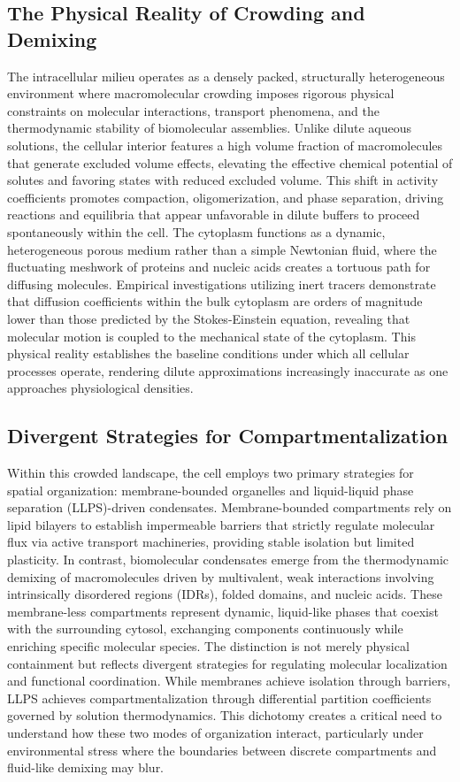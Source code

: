 \documentclass[conference]{IEEEtran}
\begin{document}
\subsection{The Physical Reality of Crowding and Demixing}
The intracellular milieu operates as a densely packed, structurally heterogeneous environment where macromolecular crowding imposes rigorous physical constraints on molecular interactions, transport phenomena, and the thermodynamic stability of biomolecular assemblies. Unlike dilute aqueous solutions, the cellular interior features a high volume fraction of macromolecules that generate excluded volume effects, elevating the effective chemical potential of solutes and favoring states with reduced excluded volume. This shift in activity coefficients promotes compaction, oligomerization, and phase separation, driving reactions and equilibria that appear unfavorable in dilute buffers to proceed spontaneously within the cell. The cytoplasm functions as a dynamic, heterogeneous porous medium rather than a simple Newtonian fluid, where the fluctuating meshwork of proteins and nucleic acids creates a tortuous path for diffusing molecules. Empirical investigations utilizing inert tracers demonstrate that diffusion coefficients within the bulk cytoplasm are orders of magnitude lower than those predicted by the Stokes-Einstein equation, revealing that molecular motion is coupled to the mechanical state of the cytoplasm. This physical reality establishes the baseline conditions under which all cellular processes operate, rendering dilute approximations increasingly inaccurate as one approaches physiological densities.~\cite{cite_42ed299a53990c06}

\subsection{Divergent Strategies for Compartmentalization}
Within this crowded landscape, the cell employs two primary strategies for spatial organization: membrane-bounded organelles and liquid-liquid phase separation (LLPS)-driven condensates. Membrane-bounded compartments rely on lipid bilayers to establish impermeable barriers that strictly regulate molecular flux via active transport machineries, providing stable isolation but limited plasticity. In contrast, biomolecular condensates emerge from the thermodynamic demixing of macromolecules driven by multivalent, weak interactions involving intrinsically disordered regions (IDRs), folded domains, and nucleic acids. These membrane-less compartments represent dynamic, liquid-like phases that coexist with the surrounding cytosol, exchanging components continuously while enriching specific molecular species. The distinction is not merely physical containment but reflects divergent strategies for regulating molecular localization and functional coordination. While membranes achieve isolation through barriers, LLPS achieves compartmentalization through differential partition coefficients governed by solution thermodynamics. This dichotomy creates a critical need to understand how these two modes of organization interact, particularly under environmental stress where the boundaries between discrete compartments and fluid-like demixing may blur.~\cite{cite_7161cfcb40366dd0,cite_afcca09a0a820cb3}
\end{document}
